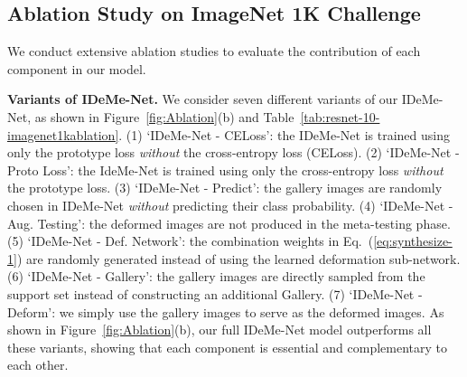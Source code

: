 \documentclass[10pt,letterpaper,twocolumn]{article}
\begin{document}
\subsection{Ablation Study on ImageNet 1K Challenge}

We conduct extensive ablation studies to evaluate the contribution of
each component in our model.

\noindent \textbf{Variants of IDeMe-Net.} We consider seven different
variants of our IDeMe-Net, as shown in Figure~\ref{fig:Ablation}(b)
and Table~\ref{tab:resnet-10-imagenet1kablation}. (1) `IDeMe-Net - CELoss': the IDeMe-Net is trained using only the prototype loss
\emph{without} the cross-entropy loss (CELoss). (2) `IDeMe-Net - Proto
Loss': the IdeMe-Net is trained using only the cross-entropy
loss \emph{without} the prototype loss. (3) `IDeMe-Net - Predict':
the gallery images are randomly chosen in IDeMe-Net \emph{without}
predicting their class probability. (4) `IDeMe-Net - Aug. Testing':
the deformed images are not produced in the meta-testing phase. (5) `IDeMe-Net
- Def. Network': the combination weights in Eq.~(\ref{eq:synthesize-1})
are randomly generated instead of using the learned deformation sub-network.
(6) `IDeMe-Net - Gallery': the gallery images are directly sampled from
the support set instead of constructing an additional Gallery. (7)
`IDeMe-Net - Deform': we simply use the gallery images to serve as the
deformed images. As shown in Figure~\ref{fig:Ablation}(b), our full
IDeMe-Net model outperforms all these variants, showing that
each component is essential and complementary to each other.
\end{document}
